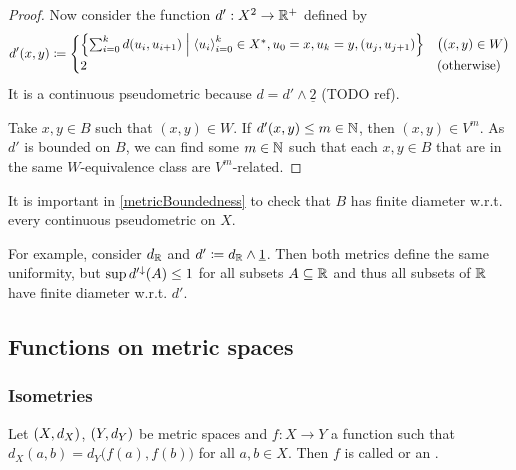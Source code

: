 \begin{proof}
Now consider the function $d': X^2\to \mathbb{R}^+$ defined by
\[ d'(x,y) \defeq \begin{cases}
\setbuilder{\sum_{i=0}^kd(u_i, u_{i+1})}{\seq{u_i}_{i=0}^k\in X^*, u_0 = x, u_k = y, (u_{j},u_{j+1})} & \big((x,y)\in W\big) \\
2 & (\text{otherwise})
\end{cases} \]
It is a continuous pseudometric because $d = d'\wedge \underline{2}$ (TODO ref).

Take $x,y\in B$ such that $(x,y)\in W$. If $d'(x,y)\leq m\in\mathbb{N}$, then $(x,y)\in V^m$. As $d'$ is bounded on $B$, we can find some $m\in \mathbb{N}$ such that each $x,y\in B$ that are in the same $W$-equivalence class are $V^m$-related.
\end{proof}

\begin{example}
It is important in \ref{metricBoundedness} to check that $B$ has finite diameter w.r.t. every continuous pseudometric on $X$.

For example, consider $d_{\mathbb{R}}$ and $d' \coloneqq d_{\mathbb{R}} \wedge \underline{1}$. Then both metrics define the same uniformity, but $\sup d^{\prime\downarrow}(A) \leq 1$ for all subsets $A\subseteq \mathbb{R}$ and thus all subsets of $\mathbb{R}$ have finite diameter w.r.t. $d'$. 
\end{example}

\subsection{Functions on metric spaces}
\subsubsection{Isometries}
\begin{definition}
Let $\sSet{X,d_X}$, $\sSet{Y,d_Y}$ be metric spaces and $f: X\to Y$ a function such that $d_X(a,b) = d_Y\big(f(a), f(b)\big)$ for all $a,b\in X$. Then $f$ is called  or an .
\end{definition}

